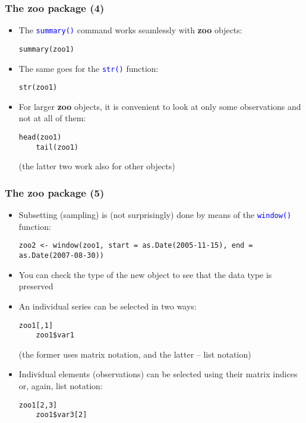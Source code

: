 \documentclass[10pt]{beamer}
\newcommand{\cc}[1]{\texttt{\textcolor{blue}{#1}}}
\theoremstyle{definition}
\begin{document}
\begin{frame}[fragile]
\frametitle{The \textbf{zoo} package (4)}
\begin{itemize}
	\item The \cc{summary()} command works seamlessly with \textbf{zoo} objects:
	\begin{lstlisting}[style = rstyle, breaklines]
	summary(zoo1)
	\end{lstlisting}
	\item The same goes for the \cc{str()} function:
	\begin{lstlisting}[style = rstyle, breaklines]
	str(zoo1)
	\end{lstlisting}
	\item For larger \textbf{zoo} objects, it is convenient to look at only some observations and not at all of them:
	\begin{lstlisting}[style = rstyle, breaklines]
	head(zoo1)
	tail(zoo1)
	\end{lstlisting}
	(the latter two work also for other objects)
\end{itemize}
\end{frame}

\begin{frame}[fragile]
\frametitle{The \textbf{zoo} package (5)}
\begin{itemize}
	\item Subsetting (sampling) is (not surprisingly) done by means of the \cc{window()} function:
	\begin{lstlisting}[style = rstyle, breaklines]
	zoo2 <- window(zoo1, start = as.Date(2005-11-15), end = as.Date(2007-08-30))
	\end{lstlisting}
	\item You can check the type of the new object to see that the data type is preserved
	\item An individual series can be selected in two ways:
	\begin{lstlisting}[style = rstyle, breaklines]
	zoo1[,1]
	zoo1$var1
	\end{lstlisting}
	(the former uses matrix notation, and the latter -- list notation)
	\item Individual elements (observations) can be selected using their matrix indices or, again, list notation:
	\begin{lstlisting}[style = rstyle, breaklines]
	zoo1[2,3]
	zoo1$var3[2] 	
	\end{lstlisting} 
\end{itemize}
\end{frame}
\end{document}
